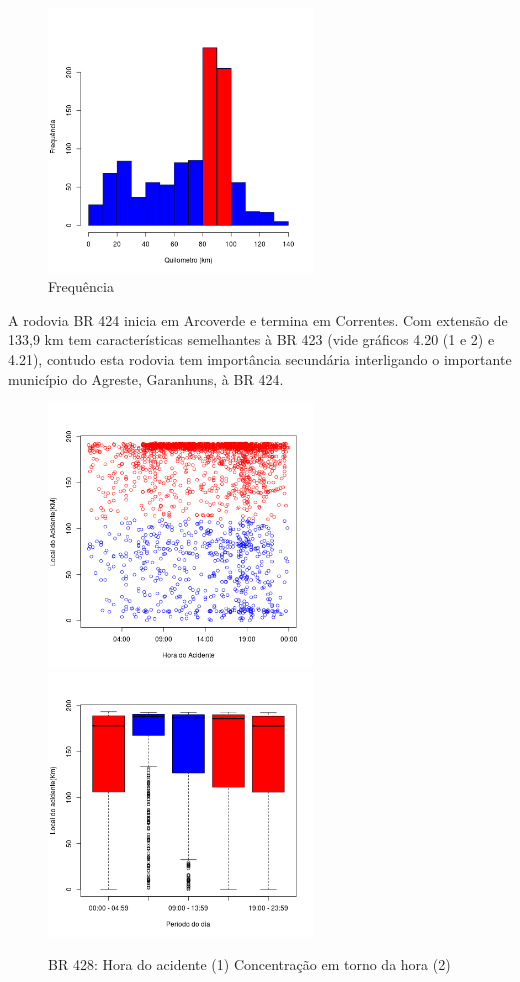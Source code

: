 \quad \quad
\begin{figure}[h]
	\centering
	\caption{ Frequência}
	\includegraphics[width=7cm,height=7cm]{Figuras/Preprocess/br424_3.png}
\end{figure}

A rodovia BR 424 inicia em Arcoverde e termina em Correntes. Com extensão de 133,9 km tem características semelhantes à BR 423 (vide gráficos 4.20 (1 e 2) e 4.21), contudo esta rodovia tem importância secundária interligando o importante município do Agreste, Garanhuns, à BR 424.
\pagebreak


\begin{figure}[h]
	\caption{BR 428: Hora do acidente (1) Concentração em torno da hora (2)}
	\includegraphics[width=7cm,height=7cm]{Figuras/Preprocess/br428_1.png}
	\includegraphics[width=7cm,height=7cm]{Figuras/Preprocess/br428_2.png}
	
\end{figure}

